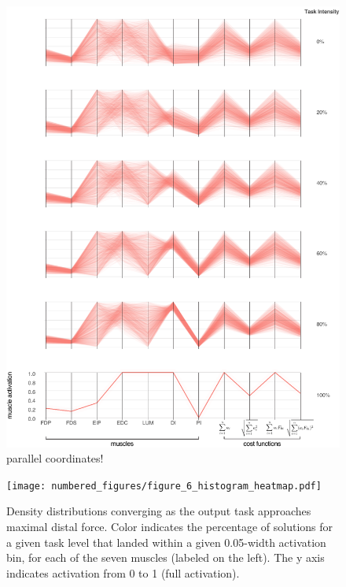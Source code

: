 \documentclass[10pt,letterpaper]{article}
\begin{document}
\begin{figure}[htbp]
\centering
\includegraphics[width=\textwidth]{numbered_figures/figure_5_parcoord.pdf}
\caption{parallel coordinates!}
\label{fig:figure_5_parcoord}
\end{figure}



\begin{figure}[htbp]
\centering
\texttt{[image: numbered\_figures/figure\_6\_histogram\_heatmap.pdf]}
\caption{Density distributions converging as the output task approaches maximal distal force. Color indicates the percentage of solutions for a given task level that landed within a given 0.05-width activation bin, for each of the seven muscles (labeled on the left). The y axis indicates activation from 0 to 1 (full activation).}
\label{fig:figure_6_histogram_heatmap}
\end{figure}
\end{document}
